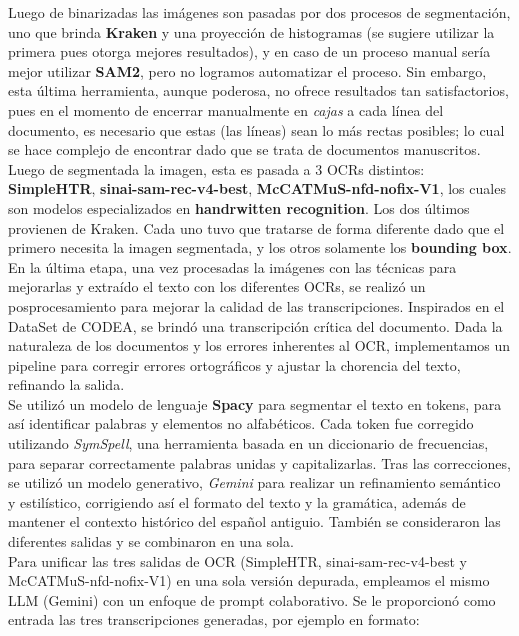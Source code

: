 \documentclass[11pt,a4paper]{article}
\begin{document}
Luego de binarizadas las im\'agenes son pasadas por dos procesos de segmentación, uno que brinda \textbf{Kraken} y una proyecci\'on de histogramas (se sugiere utilizar la primera pues otorga mejores resultados), y en caso de un proceso manual ser\'ia mejor utilizar \textbf{SAM2}, pero no logramos automatizar el proceso. Sin embargo, esta última herramienta, aunque poderosa, no ofrece resultados tan satisfactorios, pues en el momento de encerrar manualmente en \textit{cajas} a cada línea del documento, es necesario que estas (las líneas) sean lo más rectas posibles; lo cual se hace complejo de encontrar dado que se trata de documentos manuscritos. \\
Luego de segmentada la imagen, esta es pasada a 3 OCRs distintos: \textbf{SimpleHTR}, \textbf{sinai-sam-rec-v4-best}, \textbf{McCATMuS-nfd-nofix-V1}, los cuales son modelos especializados en \textbf{handrwitten recognition}. Los dos \'ultimos provienen de Kraken. Cada uno tuvo que tratarse de forma diferente dado que el primero necesita la imagen segmentada, y los otros solamente los \textbf{bounding box}.\\

En la \'ultima etapa, una vez procesadas la im\'agenes con las t\'ecnicas para mejorarlas y extraído el texto con los diferentes OCRs, se realiz\'o un posprocesamiento para mejorar la calidad de las transcripciones. Inspirados en el DataSet de CODEA, se brindó una transcripción cr\'itica del documento. Dada la naturaleza de los documentos y los errores inherentes al OCR, implementamos un pipeline para corregir errores ortogr\'aficos y ajustar la chorencia del texto, refinando la salida.\\

Se utiliz\'o un modelo de lenguaje \textbf{Spacy} para segmentar el texto en tokens, para as\'i identificar palabras y elementos no alfab\'eticos. Cada token fue corregido utilizando \textit{SymSpell}, una herramienta basada en un diccionario de frecuencias, para separar correctamente palabras unidas y capitalizarlas. Tras  las correcciones, se utiliz\'o un modelo generativo, \textit{Gemini} para realizar un refinamiento sem\'antico y estil\'istico, corrigiendo as\'i el formato del texto y la gram\'atica, adem\'as de mantener el contexto hist\'orico del español antiguio. Tambi\'en se consideraron las diferentes salidas y se combinaron en una sola.\\

Para unificar las tres salidas de OCR (SimpleHTR, sinai-sam-rec-v4-best y McCATMuS-nfd-nofix-V1) en una sola versión depurada, empleamos el mismo LLM (Gemini) con un enfoque de prompt colaborativo. Se le proporcionó como entrada las tres transcripciones generadas, por ejemplo en formato:
\end{document}
